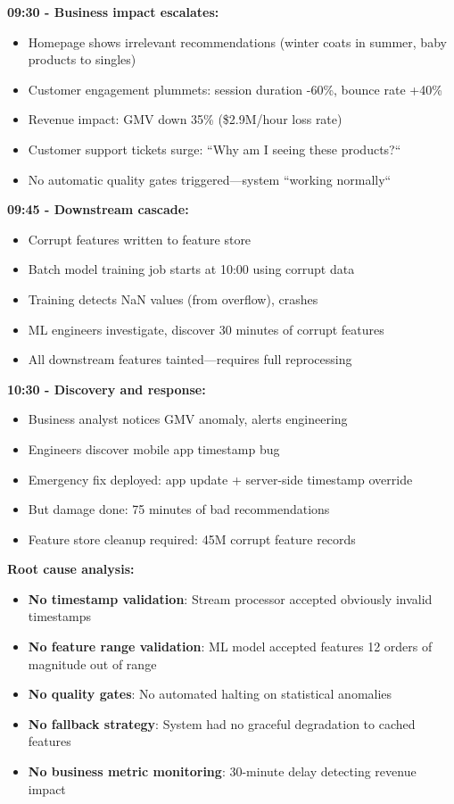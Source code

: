 \textbf{09:30 - Business impact escalates:}
\begin{itemize}
    \item Homepage shows irrelevant recommendations (winter coats in summer, baby products to singles)
    \item Customer engagement plummets: session duration -60\%, bounce rate +40\%
    \item Revenue impact: GMV down 35\% (\$2.9M/hour loss rate)
    \item Customer support tickets surge: ``Why am I seeing these products?``
    \item No automatic quality gates triggered---system ``working normally``
\end{itemize}

\textbf{09:45 - Downstream cascade:}
\begin{itemize}
    \item Corrupt features written to feature store
    \item Batch model training job starts at 10:00 using corrupt data
    \item Training detects NaN values (from overflow), crashes
    \item ML engineers investigate, discover 30 minutes of corrupt features
    \item All downstream features tainted---requires full reprocessing
\end{itemize}

\textbf{10:30 - Discovery and response:}
\begin{itemize}
    \item Business analyst notices GMV anomaly, alerts engineering
    \item Engineers discover mobile app timestamp bug
    \item Emergency fix deployed: app update + server-side timestamp override
    \item But damage done: 75 minutes of bad recommendations
    \item Feature store cleanup required: 45M corrupt feature records
\end{itemize}

\textbf{Root cause analysis:}
\begin{itemize}
    \item \textbf{No timestamp validation}: Stream processor accepted obviously invalid timestamps
    \item \textbf{No feature range validation}: ML model accepted features 12 orders of magnitude out of range
    \item \textbf{No quality gates}: No automated halting on statistical anomalies
    \item \textbf{No fallback strategy}: System had no graceful degradation to cached features
    \item \textbf{No business metric monitoring}: 30-minute delay detecting revenue impact
\end{itemize}

